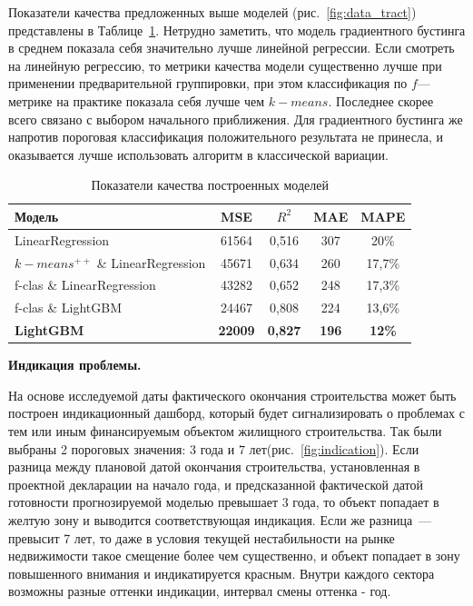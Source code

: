 \documentclass[12pt,a4paper]{article} %
\begin{document}
Показатели качества предложенных выше моделей (рис.~\ref{fig:data_tract}) представлены в Таблице~\ref{Tab:3}. Нетрудно заметить, что модель градиентного бустинга в среднем показала себя значительно лучше линейной регрессии. Если смотреть на линейную регрессию, то метрики качества модели существенно лучше при применении предварительной группировки, при этом классификация по $f$---метрике
на практике показала себя лучше чем $k-means$. Последнее скорее всего связано с выбором начального приближения. Для градиентного бустинга же напротив пороговая классификация положительного результата не принесла, и оказывается лучше использовать алгоритм в классической вариации. 
\begin{table}[h]
	\caption{Показатели качества построенных моделей}
	\centering
	\begin{tabular}{lcccc}
		
		\hline  Модель& MSE &  $R^2$ & MAE & MAPE \\
		\hline LinearRegression  & 61564 & 0,516 & 307 & 20\%\\
		$k-means^{++}$ \& LinearRegression  & 45671 & 0,634 & 260& 17,7\%\\
		f-clas \& LinearRegression & 43282 & 0,652 & 248 & 17,3\%\\
		f-clas \& LightGBM & 24467 &  0,808 & 224 & 13,6\%\\
		\hline
		\textbf{LightGBM}&  \textbf{22009}& \textbf{0,827}& \textbf{196}&
		\textbf{12\%}   \\
		\hline 
	\end{tabular}
	
	\label{Tab:3}
\end{table}

\textbf{Индикация проблемы.} 

На основе исследуемой даты фактического окончания строительства может быть построен индикационный дашборд, который будет сигнализировать о проблемах с тем или иным финансируемым объектом жилищного строительства. 
Так были выбраны 2 пороговых значения: $3$ года и $7$ лет(рис.~\ref{fig:indication}). Если разница между плановой датой окончания строительства, установленная в проектной декларации на начало года, и предсказанной фактической датой готовности прогнозируемой моделью превышает 3 года, то объект попадает в желтую зону и выводится соответствующая индикация. Если же разница~--- превысит 7 лет, то даже в условия текущей нестабильности на рынке недвижимости такое смещение более чем существенно, и объект попадает в зону повышенного внимания и индикатируется красным. Внутри каждого сектора возможны разные оттенки индикации, интервал смены оттенка - год.
\end{document}
